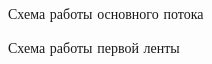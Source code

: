 \documentclass[a4paper,12pt]{report}
\begin{document}
\begin{figure}[ht!]
\caption{Схема работы основного потока}
\end{figure}

\newpage

\begin{figure}[ht!]
\caption{Схема работы первой ленты}
\end{figure}
\end{document}
